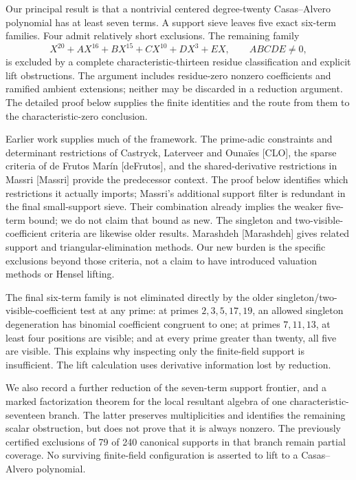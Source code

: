 \documentclass[
  british,
  10pt,
]{article}
\begin{document}
Our principal result is that a nontrivial centered degree-twenty
Casas--Alvero polynomial has at least seven terms. A support sieve
leaves five exact six-term families. Four admit relatively short
exclusions. The remaining family \[
X^{20}+AX^{16}+BX^{15}+CX^{10}+DX^3+EX,\qquad ABCDE\ne0,
\] is excluded by a complete characteristic-thirteen residue
classification and explicit lift obstructions. The argument includes
residue-zero nonzero coefficients and ramified ambient extensions;
neither may be discarded in a reduction argument. The detailed proof
below supplies the finite identities and the route from them to the
characteristic-zero conclusion.

Earlier work supplies much of the framework. The prime-adic constraints
and determinant restrictions of Castryck, Laterveer and Ounaïes
{[}CLO{]}, the sparse criteria of de Frutos Marín {[}deFrutos{]}, and
the shared-derivative restrictions in Massri {[}Massri{]} provide the
predecessor context. The proof below identifies which restrictions it
actually imports; Massri's additional support filter is redundant in the
final small-support sieve. Their combination already implies the weaker
five-term bound; we do not claim that bound as new. The singleton and
two-visible-coefficient criteria are likewise older results. Marashdeh
{[}Marashdeh{]} gives related support and triangular-elimination
methods. Our new burden is the specific exclusions beyond those
criteria, not a claim to have introduced valuation methods or Hensel
lifting.

The final six-term family is not eliminated directly by the older
singleton/two-visible-coefficient test at any prime: at primes
\(2,3,5,17,19\), an allowed singleton degeneration has binomial
coefficient congruent to one; at primes \(7,11,13\), at least four
positions are visible; and at every prime greater than twenty, all five
are visible. This explains why inspecting only the finite-field support
is insufficient. The lift calculation uses derivative information lost
by reduction.

We also record a further reduction of the seven-term support frontier,
and a marked factorization theorem for the local resultant algebra of
one characteristic-seventeen branch. The latter preserves multiplicities
and identifies the remaining scalar obstruction, but does not prove that
it is always nonzero. The previously certified exclusions of 79 of 240
canonical supports in that branch remain partial coverage. No surviving
finite-field configuration is asserted to lift to a Casas--Alvero
polynomial.
\end{document}
